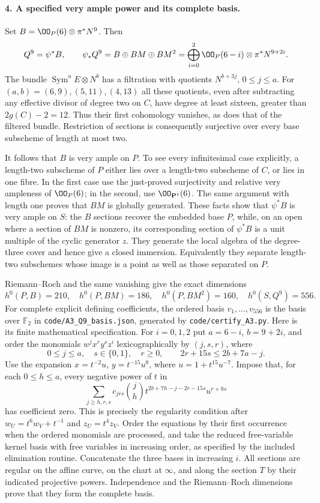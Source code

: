 \paragraph{4. A specified very ample power and its complete basis.}
Set $B=\OO_P(6)\otimes\pi^*N^9$. Then
\[
 Q^9=\psi^*B,\qquad
 \psi_*Q^9=B\oplus BM\oplus BM^2
   =\bigoplus_{i=0}^2\OO_P(6-i)\otimes\pi^*N^{9+2i}.
\]
The bundle $\operatorname{Sym}^a E\otimes N^b$ has a filtration
with quotients $N^{b+3j}$, $0\leq j\leq a$.
For $(a,b)=(6,9),(5,11),(4,13)$ all these quotients, even after
subtracting any effective divisor of degree two on $C$, have degree
at least sixteen, greater than $2g(C)-2=12$.
Thus their first cohomology vanishes, as does that of the filtered
bundle. Restriction of sections is consequently surjective over every
base subscheme of length at most two.

It follows that $B$ is very ample on $P$. To see every infinitesimal
case explicitly, a length-two subscheme of $P$ either lies over a
length-two subscheme of $C$, or lies in one fibre. In the first case
use the just-proved surjectivity and relative very ampleness of
$\OO_P(6)$; in the second, use $\OO_{\mathbf P^1}(6)$.
The same argument with length one proves that $BM$ is globally
generated. These facts show that $\psi^*B$ is very ample on $S$:
the $B$ sections recover the embedded base $P$, while, on an open
where a section of $BM$ is nonzero, its corresponding section of
$\psi^*B$ is a unit multiple of the cyclic generator $z$.
They generate the local algebra of the degree-three cover and hence
give a closed immersion. Equivalently they separate length-two
subschemes whose image is a point as well as those separated on $P$.

Riemann--Roch and the same vanishing give the exact dimensions
\[
 h^0(P,B)=210,\quad h^0(P,BM)=186,\quad
 h^0(P,BM^2)=160,\quad h^0(S,Q^9)=556.
\]
For complete explicit defining coefficients, the ordered basis
$v_1,\ldots,v_{556}$ is the basis over $\mathbb F_2$ in
\texttt{code/A3\_Q9\_basis.json}, generated by
\texttt{code/certify\_A3.py}. Here is its finite mathematical
specification. For $i=0,1,2$ put $a=6-i$, $b=9+2i$, and order the
monomials $w^jx^ry^sz^i$ lexicographically by $(j,s,r)$, where
\[
 0\leq j\leq a,\quad s\in\{0,1\},\quad r\geq0,
 \qquad 2r+15s\leq2b+7a-j.
\]
Use the expansion $x=t^{-2}u$, $y=t^{-15}u^8$, where
$u=1+t^{15}u^{-7}$. Impose that, for each $0\leq h\leq a$,
every negative power of $t$ in
\[
 \sum_{j\geq h,r,s}c_{jrs}{j\choose h}
       t^{2b+7h-j-2r-15s}u^{r+8s}
\]
has coefficient zero. This is precisely the regularity condition
after $w_U=t^6w_V+t^{-1}$ and $z_U=t^4z_V$.
Order the equations by their first occurrence when the ordered
monomials are processed, and take the reduced free-variable kernel
basis with free variables in increasing order, as specified by the
included elimination routine. Concatenate the three bases in
increasing $i$. All sections are regular on the affine curve, on
the chart at $\infty$, and along the section $T$ by their indicated
projective powers. Independence and the Riemann--Roch dimensions prove
that they form the complete basis.

